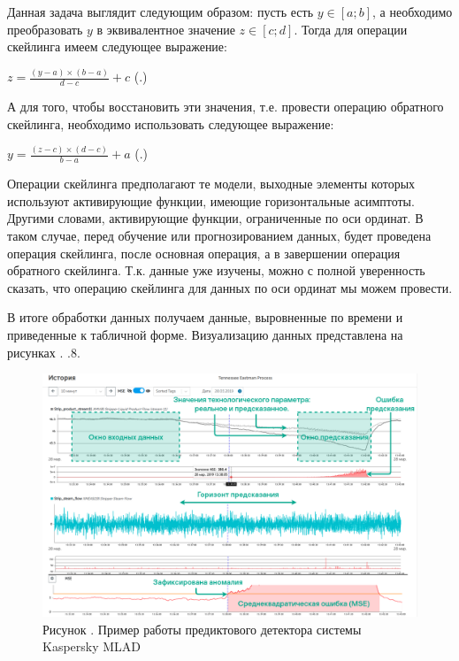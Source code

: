   \par \redline Данная задача выглядит следующим образом: пусть есть $y \in \left[a; b\right]$, а необходимо преобразовать $y$ в эквивалентное значение $z \in \left[c; d\right]$. Тогда для операции скейлинга имеем следующее выражение:

  	\formulaspace \par \redline 
  $ z = \frac{\left(y - a\right) \times \left(b - a\right)}{d - c} + c $
  \hfill (\thechaptercntr .\theformulacntr) \redline
  \formulaspace \addtocounter{formulacntr}{1}
  

  \par \redline А для того, чтобы восстановить эти значения, т.е. провести операцию обратного скейлинга, необходимо использовать следующее выражение: 

	\formulaspace \par \redline 
$ y = \frac{\left(z - c\right) \times \left(d - c\right)}{b - a} + a $
\hfill (\thechaptercntr .\theformulacntr) \redline
\formulaspace \addtocounter{formulacntr}{1}

  \par \redline Операции скейлинга предполагают те модели, выходные элементы которых используют активирующие функции, имеющие горизонтальные асимптоты. Другими словами, активирующие функции, ограниченные по оси ординат. В таком случае, перед обучение или прогнозированием данных, будет проведена операция скейлинга, после основная операция, а в завершении операция обратного скейлинга. Т.к. данные уже изучены, можно с полной уверенность сказать, что операцию скейлинга для данных по оси ординат мы можем провести.
  
  \par \redline В итоге обработки данных получаем данные, выровненные по времени и приведенные к табличной форме. Визуализацию данных представлена на рисунках \thechaptercntr.\theimagecntr {--} \thechaptercntr.8.

  \par
  
    \begin{figure}
  	\centering
  	\def\svgwidth{\textwidth}
  	\includegraphics[scale=0.6]{images/MLADex.png}
  	\caption*{\gostFont Рисунок \thechaptercntr .\theimagecntr \spc {--} Пример работы предиктового детектора системы Kaspersky MLAD}
  	\label{fig:MLADBlackBox}
  \end{figure} \addtocounter{imagecntr}{1}
  
